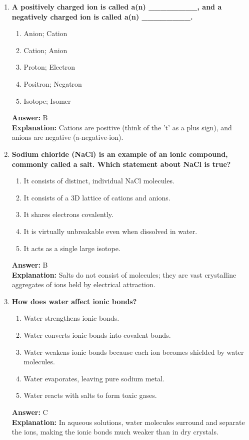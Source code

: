 \documentclass[11pt, a4paper]{article}
\begin{document}
\begin{enumerate}
\item \textbf{A positively charged ion is called a(n) \_\_\_\_\_\_\_\_, and a negatively charged ion is called a(n) \_\_\_\_\_\_\_\_.}
\begin{enumerate}[label=\Alph*.]
    \item Anion; Cation
    \item Cation; Anion
    \item Proton; Electron
    \item Positron; Negatron
    \item Isotope; Isomer
\end{enumerate}
\textbf{Answer:} B \\
\textbf{Explanation:} Cations are positive (think of the 't' as a plus sign), and anions are negative (a-negative-ion).

\item \textbf{Sodium chloride (NaCl) is an example of an ionic compound, commonly called a salt. Which statement about NaCl is true?}
\begin{enumerate}[label=\Alph*.]
    \item It consists of distinct, individual NaCl molecules.
    \item It consists of a 3D lattice of cations and anions.
    \item It shares electrons covalently.
    \item It is virtually unbreakable even when dissolved in water.
    \item It acts as a single large isotope.
\end{enumerate}
\textbf{Answer:} B \\
\textbf{Explanation:} Salts do not consist of molecules; they are vast crystalline aggregates of ions held by electrical attraction.

\item \textbf{How does water affect ionic bonds?}
\begin{enumerate}[label=\Alph*.]
    \item Water strengthens ionic bonds.
    \item Water converts ionic bonds into covalent bonds.
    \item Water weakens ionic bonds because each ion becomes shielded by water molecules.
    \item Water evaporates, leaving pure sodium metal.
    \item Water reacts with salts to form toxic gases.
\end{enumerate}
\textbf{Answer:} C \\
\textbf{Explanation:} In aqueous solutions, water molecules surround and separate the ions, making the ionic bonds much weaker than in dry crystals.


\end{enumerate}
\end{document}
